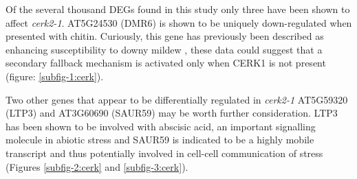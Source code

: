 \documentclass[../main.tex]{subfiles}
\begin{document}
Of the several thousand DEGs found in this study only three have been shown to
affect \textit{cerk2-1}. AT5G24530 (DMR6) is shown to be uniquely down-regulated when
presented with chitin. Curiously, this gene has previously been described as
enhancing susceptibility to downy mildew \cite{DOWNYMILDEWRESISTANT}, these data
could suggest that a secondary fallback mechanism is activated only when CERK1 is
not present (figure: \ref{subfig-1:cerk}).

Two other genes that appear to be differentially regulated in \textit{cerk2-1}
AT5G59320 (LTP3) and AT3G60690 (SAUR59) may be worth further consideration. LTP3
has been shown to be involved with abscisic acid, an important signalling
molecule in abiotic stress \cite{vishwakarmaAbscisicAcidSignaling2017} and
SAUR59 is indicated to be a highly mobile transcript
\cite{thiemeEndogenousArabidopsisMessenger2015} and thus potentially involved in
cell-cell communication of stress (Figures \ref{subfig-2:cerk} and
\ref{subfig-3:cerk}).

\end{document}
